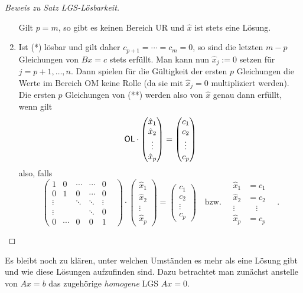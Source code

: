 \documentclass[a4paper,11pt,oneside]{article}
\theoremstyle{definition}
\begin{document}
\begin{proof}[Beweis zu Satz LGS-Lösbarkeit]
\begin{enumerate}
Gilt $p=m$, so gibt es keinen Bereich \textsf{UR} und $ \hat{x}$ ist stets eine Lösung.
\item
Ist (*) lösbar und gilt daher $c_{p+1}=\cdots=c_m=0$, so sind die letzten $m-p$ Gleichungen von $Bx=c$ stets erfüllt. Man kann nun ${\hat x}_j:=0$ setzen für $j=p+1,\ldots,n$. Dann  spielen für die Gültigkeit der ersten $p$ Gleichungen die Werte im Bereich \textsf{OM} keine Rolle (da sie mit ${\hat x}_j=0$ multipliziert werden). Die ersten $p$ Gleichungen von (**) werden also von $\hat{x}$ genau dann erfüllt, wenn gilt
$$
\text{\textsf{OL}}\cdot
\begin{pmatrix}
{\hat x}_1\\
{\hat x}_2\\
\vdots\\
{\hat x}_p
\end{pmatrix}
=
\begin{pmatrix}
 c_1\\c_2\\\vdots\\c_p
\end{pmatrix}
$$
also, falls
$$
\begin{pmatrix}
1&0&\cdots & \cdots &0\\
0&1&0&\cdots &0\\
\vdots &&\ddots &\ddots &\vdots\\
\vdots &&&\ddots & 0&\\
0&\cdots &0&0& 1
\end{pmatrix}
\cdot
\begin{pmatrix}
{\hat x}_1\\{\hat x}_2\\\vdots\\{\hat x}_p
\end{pmatrix}
=
\begin{pmatrix}
c_1\\c_2\\\vdots\\c_p
\end{pmatrix}
\quad \text{bzw.}\quad
\begin{aligned}
{\hat x}_1 & = c_1\\
{\hat x}_2 & = c_2\\
\vdots &\quad \vdots\\
{\hat x}_p&=c_p
\end{aligned}\quad.
$$
\end{enumerate}
\end{proof}

Es bleibt noch zu klären, unter welchen Umständen es mehr als eine Lösung gibt und wie diese Lösungen aufzufinden sind. Dazu betrachtet man zunächst anstelle von $Ax=b$ das zugehörige \emph{homogene} LGS $Ax=0$.
\end{document}
